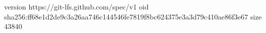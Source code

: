 version https://git-lfs.github.com/spec/v1
oid sha256:ff68e1d2de9c3a26aa746c144546fe7819f8bc624375e3a3d79c410ae86f3e67
size 43840
